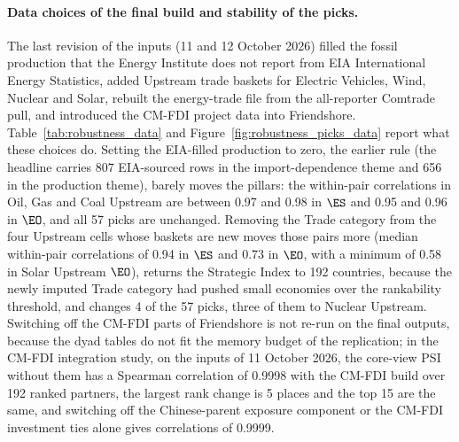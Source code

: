\paragraph{Data choices of the final build and stability of the picks.} The last revision of
the inputs (11 and 12 October 2026) filled the fossil production that the Energy Institute does
not report from EIA International Energy Statistics, added Upstream trade baskets for Electric
Vehicles, Wind, Nuclear and Solar, rebuilt the energy-trade file from the all-reporter Comtrade
pull, and introduced the CM-FDI project data into Friendshore. Table~\ref{tab:robustness_data}
and Figure~\ref{fig:robustness_picks_data} report what these choices do. Setting the EIA-filled
production to zero, the earlier rule (the headline carries 807 EIA-sourced rows in the
import-dependence theme and 656 in the production theme), barely moves the pillars: the
within-pair correlations in Oil, Gas and Coal Upstream are between 0.97 and 0.98 in $\ES$ and
0.95 and 0.96 in $\EO$, and all 57 picks are unchanged. Removing the Trade category from the
four Upstream cells whose baskets are new moves those pairs more (median within-pair
correlations of 0.94 in $\ES$ and 0.73 in $\EO$, with a minimum of 0.58 in Solar Upstream $\EO$),
returns the Strategic Index to 192 countries, because the newly imputed Trade category had pushed
small economies over the rankability threshold, and changes 4 of the 57 picks, three of them to
Nuclear Upstream. Switching off the CM-FDI parts of Friendshore is not re-run on the final
outputs, because the dyad tables do not fit the memory budget of the replication; in the CM-FDI
integration study, on the inputs of 11 October 2026, the core-view PSI without them has a
Spearman correlation of 0.9998 with the CM-FDI build over 192 ranked partners, the largest rank
change is 5 places and the top 15 are the same, and switching off the Chinese-parent exposure
component or the CM-FDI investment ties alone gives correlations of 0.9999.

